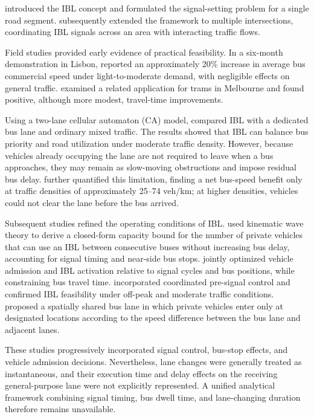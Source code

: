 \citet{viegas2001widening} introduced the IBL concept and formulated the signal-setting problem for a single road segment. \citet{viegas2004intermittent} subsequently extended the framework to multiple intersections, coordinating IBL signals across an area with interacting traffic flows.

Field studies provided early evidence of practical feasibility. In a six-month demonstration in Lisbon, \citet{viegas2007intermittent} reported an approximately 20\% increase in average bus commercial speed under light-to-moderate demand, with negligible effects on general traffic. \citet{currie2008intermittent} examined a related application for trams in Melbourne and found positive, although more modest, travel-time improvements.

Using a two-lane cellular automaton (CA) model, \citet{zhu2010numerical} compared IBL with a dedicated bus lane and ordinary mixed traffic. The results showed that IBL can balance bus priority and road utilization under moderate traffic density. However, because vehicles already occupying the lane are not required to leave when a bus approaches, they may remain as slow-moving obstructions and impose residual bus delay. \citet{2015Exploring} further quantified this limitation, finding a net bus-speed benefit only at traffic densities of approximately 25--74 veh/km; at higher densities, vehicles could not clear the lane before the bus arrived.

Subsequent studies refined the operating conditions of IBL. \citet{lin2022capability} used kinematic wave theory to derive a closed-form capacity bound for the number of private vehicles that can use an IBL between consecutive buses without increasing bus delay, accounting for signal timing and near-side bus stops. \citet{xie2023modelling} jointly optimized vehicle admission and IBL activation relative to signal cycles and bus positions, while constraining bus travel time. \citet{zhao2023setting} incorporated coordinated pre-signal control and confirmed IBL feasibility under off-peak and moderate traffic conditions. \citet{yin2024optimization} proposed a spatially shared bus lane in which private vehicles enter only at designated locations according to the speed difference between the bus lane and adjacent lanes.

These studies progressively incorporated signal control, bus-stop effects, and vehicle admission decisions. Nevertheless, lane changes were generally treated as instantaneous, and their execution time and delay effects on the receiving general-purpose lane were not explicitly represented. A unified analytical framework combining signal timing, bus dwell time, and lane-changing duration therefore remains unavailable.

